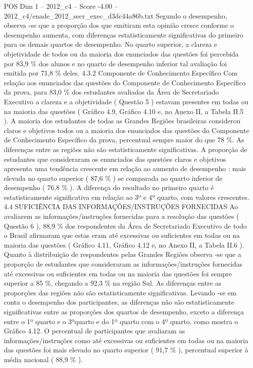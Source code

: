 \begin{textsample}{POS Dim 1 – 2012\_c4 – Score -4.00 – 2012\_c4/enade\_2012\_secr\_exec\_d3dc44a86b.txt}
Segundo o desempenho, observa -se que a proporção dos que emitiram esta opinião cresce conforme o desempenho aumenta, com diferenças estatisticamente significativas do primeiro para os demais quartos de desempenho.
No quarto superior, a clareza e objetividade de todos ou da maioria dos enunciados das questões foi percebida por 83,9 \% dos alunos e no quarto de desempenho inferior tal avaliação foi emitida por 71,8 \% deles. 4.3.2 Componente de Conhecimento Específico Com relação aos enunciados das questões do Componente de Conhecimento Específico da prova, para 83,0 \% dos estudantes avaliados da Área de Secretariado Executivo a clareza e a objetividade ( Questão 5 ) estavam presentes em todas ou na maioria das questões ( Gráfico 4.9, Gráfico 4.10 e, no Anexo II, a Tabela II.5 ).
A maioria dos estudantes de todas as Grandes Regiões brasileiras considerou claros e objetivos todos ou a maioria dos enunciados das questões do Componente de Conhecimento Específico da prova, percentual sempre maior do que 78 \%.
As diferenças entre as regiões não são estatisticamente significativas.
A proporção de estudantes que consideraram os enunciados das questões claros e objetivos apresenta uma tendência crescente em relação ao aumento de desempenho : mais elevada no quarto superior ( 87,6 \% ) se comparada ao quarto inferior de desempenho ( 76,8 \% ).
A diferença do resultado no primeiro quarto é estatisticamente significativa em relação ao 3º e 4º quarto, com valores crescentes. 4.4 SUFICIÊNCIA DAS INFORMAÇÕES/INSTRUÇÕES FORNECIDAS Ao avaliarem as informações/instruções fornecidas para a resolução das questões ( Questão 6 ), 88,9 \% dos respondentes da Área de Secretariado Executivo de todo o Brasil afirmaram que estas eram até excessivas ou suficientes em todas ou na maioria das questões ( Gráfico 4.11, Gráfico 4.12 e, no Anexo II, a Tabela II.6 ).
Quanto à distribuição de respondentes pelas Grandes Regiões observa -se que a proporção de estudantes que consideraram as informações/instruções fornecidas até excessivas ou suficientes em todas ou na maioria das questões foi sempre superior a 85 \%, chegando a 92,3 \% na região Sul.
As diferenças entre as proporções das regiões não são estatisticamente significativas.
Levando -se em conta o desempenho dos participantes, as diferenças não são estatisticamente significativas entre as proporções dos quartos de desempenho, exceto a diferença entre o 1º quarto e o 3ºquarto e do 1º quarto com o 4º quarto, como mostra o Gráfico 4.12.
O percentual de participantes que avaliaram as informações/instruções como até excessivas ou suficientes em todas ou na maioria das questões foi mais elevado no quarto superior ( 91,7 \% ), percentual superior à média nacional ( 88,9 \% ).

\end{textsample}
